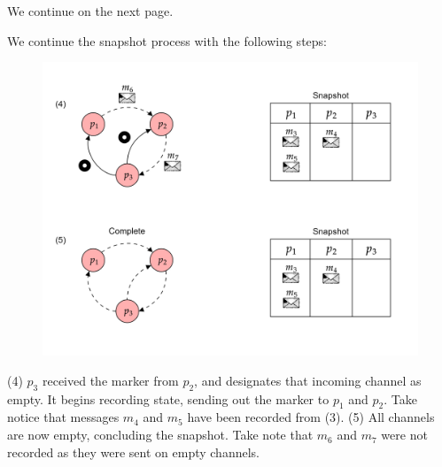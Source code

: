 \noindent
We continue on the next page.

\newpage 

\noindent
We continue the snapshot process with the following steps:
\begin{figure}[h] 
    \centering
    \includegraphics[width=1\textwidth]{Sections/snap/snap_exe_2.png}
\end{figure}

\noindent
(4) $p_3$ received the marker from $p_2$, and designates that incoming channel as empty. It begins recording state, sending out the marker to $p_1$ and $p_2$.
Take notice that messages $m_4$ and $m_5$ have been recorded from (3).
(5) All channels are now empty, concluding the snapshot. Take note that $m_6$ and $m_7$ were not recorded as they were sent on empty channels.